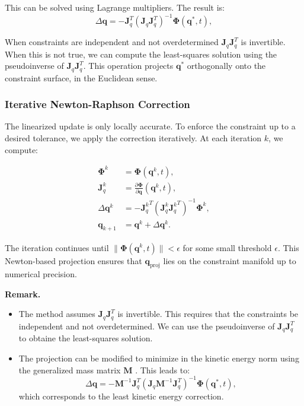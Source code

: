 \documentclass{article}
\newcommand{\mf}[1]{{\mathbf{#1}}}
\newenvironment{remark}{\begin{remarkbox}\textbf{Remark.}~}{\end{remarkbox}}
\begin{document}
This can be solved using Lagrange multipliers. The result is:
\begin{equation}
    \Delta \mf{q} = -\mf{J}_q^T(\mf{J}_q \mf{J}_q^T)^{-1} \mf{\Phi}(\mf{q}^*, t),
\end{equation}

When constraints are independent and not overdetermined $\mf{J}_q \mf{J}_q^T$ is
invertible. When this is not true, we can compute the least-squares solution
using the pseudoinverse of $\mf{J}_q \mf{J}_q^T$. This operation projects \(
\mf{q}^* \) orthogonally onto the constraint surface, in the Euclidean sense.

\subsubsection*{Iterative Newton-Raphson Correction}

The linearized update is only locally accurate. To enforce the constraint up to
a desired tolerance, we apply the correction iteratively. At each iteration \( k
\), we compute:

\begin{align}
    \mf{\Phi}^k &= \mf{\Phi}(\mf{q}^k, t), \\
    \mf{J}_q^k &= \frac{\partial \mf{\Phi}}{\partial \mf{q}} (\mf{q}^k, t), \\
    \Delta \mf{q}^k &= -{\mf{J}_q^k}^T (\mf{J}_q^k {\mf{J}_q^k}^T)^{-1} \mf{\Phi}^k, \\
    \mf{q}_{k+1} &= \mf{q}^k + \Delta \mf{q}^k.
\end{align}

The iteration continues until \( \| \mf{\Phi}(\mf{q}^k, t) \| < \epsilon \) for
some small threshold \( \epsilon \). This Newton-based projection ensures that
\( \mf{q}_{\text{proj}} \) lies on the constraint manifold up to numerical
precision.

\begin{remark}    
\begin{itemize}
    \item The method assumes \( \mf{J}_q \mf{J}_q^T \) is invertible. This
    requires that the constraints be independent and not overdetermined. We can
    use the pseudoinverse of $\mf{J}_q \mf{J}_q^T$ to obtaine the least-squares
    solution.
    \item The projection can be
    modified to minimize in the kinetic energy norm \cite{bib:cline2002rigid}
    using the generalized mass matrix \( \mf{M} \) . This leads to:
    \[
        \Delta \mf{q} = -\mf{M}^{-1} \mf{J}_q^T (\mf{J}_q \mf{M}^{-1} \mf{J}_q^T)^{-1} \mf{\Phi}(\mf{q}^*, t),
    \]
    which corresponds to the least kinetic energy correction.
\end{itemize}
\end{remark}
\end{document}
